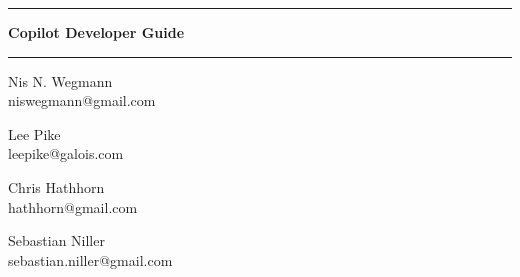 \documentclass[12pt]{article}
\theoremstyle{example}
\newcommand{\HRule}{\rule{\linewidth}{0.25pt}}
\begin{document}
\vspace{0.1cm}

\HRule

\vspace{0.6cm}

{\Huge \bfseries
Copilot Developer Guide
}


\HRule

\vspace{0.6cm}

\begin{minipage}{0.4\textwidth}
\large
\begin{center}
Nis N. Wegmann\\
\small{
niswegmann@gmail.com\\
}

\end{center}
\end{minipage}
\begin{minipage}{0.4\textwidth}
\large
\begin{center}
Lee Pike\\
\small{
leepike@galois.com\\
}
\end{center}
\end{minipage}
\vspace{1cm}



\begin{minipage}{0.3\textwidth}
\large
\begin{center}
Chris Hathhorn \\
\small{
hathhorn@gmail.com\\
}
\end{center}
\end{minipage}
\begin{minipage}{0.3\textwidth}
\large
\begin{center}
Sebastian Niller\\
\small{
sebastian.niller@gmail.com\\
}
\end{center}
\end{minipage}

\vspace{1cm}
\end{document}
